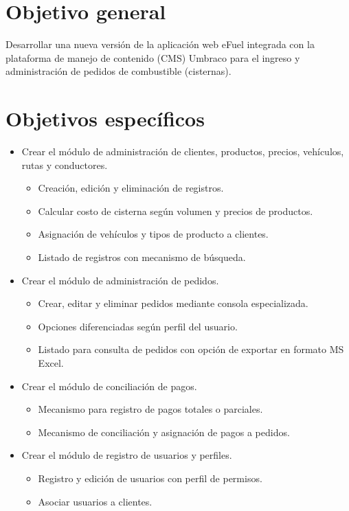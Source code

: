 \section*{Objetivo general}
Desarrollar una nueva versión de la aplicación web eFuel integrada con la plataforma de manejo de contenido (CMS) Umbraco para el ingreso y administración de pedidos de combustible (cisternas).

\section*{Objetivos específicos}
\begin{itemize}
    \item Crear el módulo de administración de clientes, productos, precios, vehículos, rutas y conductores.
    \begin{itemize}
        \item Creación, edición y eliminación de registros.
        \item Calcular costo de cisterna según volumen y precios de productos.
        \item Asignación de vehículos y tipos de producto a clientes.
        \item Listado de registros con mecanismo de búsqueda.
    \end{itemize}

    \item Crear el módulo de administración de pedidos.
    \begin{itemize}
        \item Crear, editar y eliminar pedidos mediante consola especializada.
        \item Opciones diferenciadas según perfil del usuario.
        \item Listado para consulta de pedidos con opción de exportar en formato MS Excel.
    \end{itemize}

    \item Crear el módulo de conciliación de pagos.
    \begin{itemize}
        \item Mecanismo para registro de pagos totales o parciales.
        \item Mecanismo de conciliación y asignación de pagos a pedidos.
    \end{itemize}

    \item Crear el módulo de registro de usuarios y perfiles.
    \begin{itemize}
        \item Registro y edición de usuarios con perfil de permisos.
        \item Asociar usuarios a clientes.
    \end{itemize}
\end{itemize}